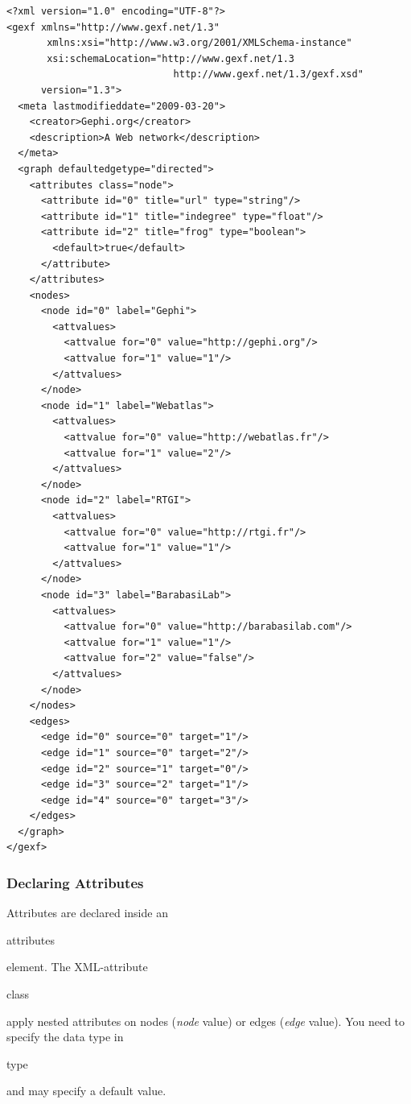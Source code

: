 \documentclass[a4paper,10pt]{article}
\begin{document}
\lstset{ style=gexf }
\begin{lstlisting}[caption={A (small) Web Graph},label=webgraph]
<?xml version="1.0" encoding="UTF-8"?>
<gexf xmlns="http://www.gexf.net/1.3"
       xmlns:xsi="http://www.w3.org/2001/XMLSchema-instance"
       xsi:schemaLocation="http://www.gexf.net/1.3
                             http://www.gexf.net/1.3/gexf.xsd"
      version="1.3">
  <meta lastmodifieddate="2009-03-20">
    <creator>Gephi.org</creator>
    <description>A Web network</description>
  </meta>
  <graph defaultedgetype="directed">
    <attributes class="node">
      <attribute id="0" title="url" type="string"/>
      <attribute id="1" title="indegree" type="float"/>
      <attribute id="2" title="frog" type="boolean">
        <default>true</default>
      </attribute>
    </attributes>
    <nodes>
      <node id="0" label="Gephi">
        <attvalues>
          <attvalue for="0" value="http://gephi.org"/>
          <attvalue for="1" value="1"/>
        </attvalues>
      </node>
      <node id="1" label="Webatlas">
        <attvalues>
          <attvalue for="0" value="http://webatlas.fr"/>
          <attvalue for="1" value="2"/>
        </attvalues>
      </node>
      <node id="2" label="RTGI">
        <attvalues>
          <attvalue for="0" value="http://rtgi.fr"/>
          <attvalue for="1" value="1"/>
        </attvalues>
      </node>
      <node id="3" label="BarabasiLab">
        <attvalues>
          <attvalue for="0" value="http://barabasilab.com"/>
          <attvalue for="1" value="1"/>
          <attvalue for="2" value="false"/>
        </attvalues>
      </node>
    </nodes>
    <edges>
      <edge id="0" source="0" target="1"/>
      <edge id="1" source="0" target="2"/>
      <edge id="2" source="1" target="0"/>
      <edge id="3" source="2" target="1"/>
      <edge id="4" source="0" target="3"/>
    </edges>
  </graph>
</gexf>
\end{lstlisting}


\subsubsection{Declaring Attributes}

Attributes are declared inside an \begin{footnotesize}attributes\end{footnotesize} element. The XML-attribute \begin{footnotesize}class\end{footnotesize} apply nested attributes on nodes (\textit{node} value) or edges (\textit{edge} value). You need to specify the data type in \begin{footnotesize}type\end{footnotesize} and may specify a default value.
\end{document}
